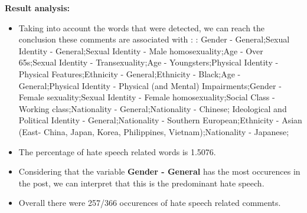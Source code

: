 \documentclass[11pt]{article}
\begin{document}
\textbf{\Large Result analysis:}

\begin{itemize}\item Taking into account the words that were detected, we can reach the conclusion these comments are associated with : : Gender - General;Sexual Identity - General;Sexual Identity - Male homosexuality;Age - Over 65s;Sexual Identity - Transexuality;Age - Youngsters;Physical Identity - Physical Features;Ethnicity - General;Ethnicity - Black;Age - General;Physical Identity - Physical (and Mental) Impairments;Gender - Female sexuality;Sexual Identity - Female homosexuality;Social Class - Working class;Nationality - General;Nationality - Chinese; Ideological and Political Identity - General;Nationality - Southern European;Ethnicity - Asian (East- China, Japan, Korea, Philippines, Vietnam);Nationality - Japanese;%

\item The percentage of hate speech related words is 1.5076.

\item Considering that the variable \textbf{Gender - General} has the most occurences in the post, we can interpret that this is the predominant hate speech.

\item Overall there were 257/366 occurences of hate speech related comments.\end{itemize}
\end{document}
